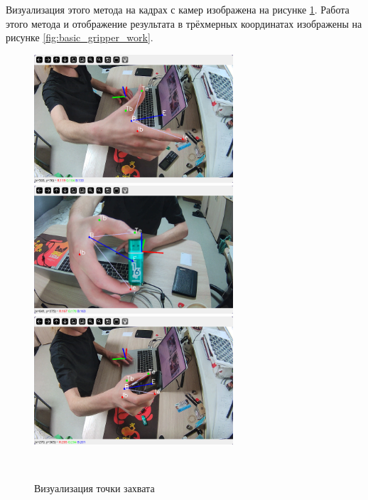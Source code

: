 \documentclass[14pt, a4paper]{extarticle}
\begin{document}
Визуализация этого метода на кадрах с камер изображена на рисунке
\ref{fig:basic_gripping}. Работа этого метода и отображение результата в
трёхмерных координатах изображены на рисунке \ref{fig:basic_gripper_work}.
\begin{figure}[h!]
    \centering
    \includegraphics[width=0.66\textwidth]{images/gripper-conversion/gripper-conversion-close-1.png}\\
    \includegraphics[width=0.66\textwidth]{images/gripper-conversion/gripper-conversion-close-2.png}\\
    \includegraphics[width=0.66\textwidth]{images/gripper-conversion/gripper-conversion-close-3.png}\\
    \caption{Визуализация точки захвата}
~\label{fig:basic_gripping}
\end{figure}
\end{document}
